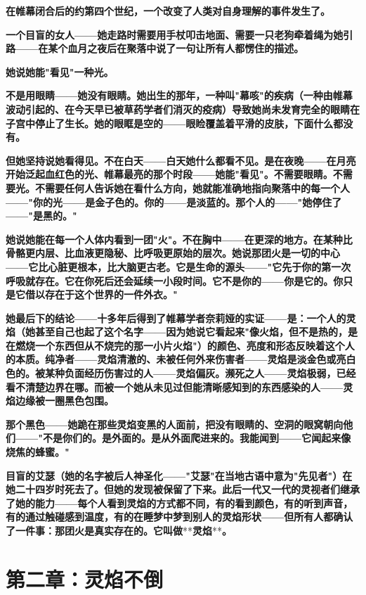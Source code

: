 \documentclass[12pt,a4paper,openany]{ctexbook}
\begin{document}
\textbf{在帷幕闭合后的约第四个世纪，一个改变了人类对自身理解的事件发生了。}


\textbf{一个目盲的女人——她走路时需要用手杖叩击地面、需要一只老狗牵着绳为她引路——在某个血月之夜后在聚落中说了一句让所有人都愣住的描述。}


\textbf{她说她能"看见"一种光。}


\textbf{不是用眼睛——她没有眼睛。她出生的那年，一种叫"幕咳"的疾病（一种由帷幕波动引起的、在今天早已被草药学者们消灭的疫病）导致她尚未发育完全的眼睛在子宫中停止了生长。她的眼眶是空的——眼睑覆盖着平滑的皮肤，下面什么都没有。}


\textbf{但她坚持说她看得见。不在白天——白天她什么都看不见。是在夜晚——在月亮开始泛起血红色的光、帷幕最亮的那个时段——她能"看见"。不需要眼睛。不需要光。不需要任何人告诉她在看什么方向，她就能准确地指向聚落中的每一个人——"你的光——是金子色的。你的——是淡蓝的。那个人的——"她停住了——"是黑的。"}


\textbf{她说她能在每一个人体内看到一团"火"。不在胸中——在更深的地方。在某种比骨骼更内层、比血液更隐秘、比呼吸更原始的层次。她说那团火是一切的中心——它比心脏更根本，比大脑更古老。它是生命的源头——"它先于你的第一次呼吸就存在。它在你死后还会延续一小段时间。它不是你的——你是它的。你只是它借以存在于这个世界的一件外衣。"}


\textbf{她最后下的结论——十多年后得到了帷幕学者奈莉娅的实证——是：一个人的灵焰（她甚至自己也起了这个名字——因为她说它看起来"像火焰，但不是热的，是在燃烧一个东西但从不烧完的那一小片火焰"）的颜色、亮度和形态反映着这个人的本质。纯净者——灵焰清澈的、未被任何外来伤害者——灵焰是淡金色或亮白色的。被某种负面经历伤害过的人——灵焰偏灰。濒死之人——灵焰极弱，已经看不清楚边界在哪。而被一个她从未见过但能清晰感知到的东西感染的人——灵焰边缘被一圈黑色包围。}


\textbf{那个黑色——她跪在那些灵焰变黑的人面前，把没有眼睛的、空洞的眼窝朝向他们——"不是你们的。是外面的。是从外面爬进来的。我能闻到——它闻起来像烧焦的蜂蜜。"}


\textbf{目盲的艾瑟（她的名字被后人神圣化——"艾瑟"在当地古语中意为"先见者"）在她二十四岁时死去了。但她的发现被保留了下来。此后一代又一代的灵视者们继承了她的能力——每个人看到灵焰的方式都不同，有的看到颜色，有的听到声音，有的通过触碰感到温度，有的在睡梦中梦到别人的灵焰形状——但所有人都确认了一件事：那团火是真实存在的。它叫做}**\textbf{灵焰}**\textbf{。}


\section*{第二章：灵焰不倒}
\end{document}

